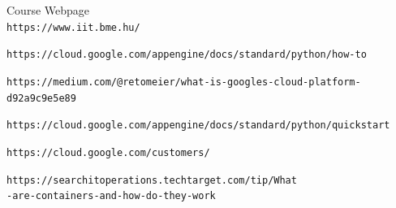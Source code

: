 \documentclass[12pt,english]{article}
\begin{document}
\begin{thebibliography}{9}

Course Webpage
\\\texttt{https://www.iit.bme.hu/}

 \texttt{https://cloud.google.com/appengine/docs/standard/python/how-to}

 \texttt{https://medium.com/@retomeier/what-is-googles-cloud-platform-d92a9c9e5e89}

 \texttt{https://cloud.google.com/appengine/docs/standard/python/quickstart}

\texttt{https://cloud.google.com/customers/}

\texttt{https://searchitoperations.techtarget.com/tip/What\\-are-containers-and-how-do-they-work}


\end{thebibliography}
\end{document}
